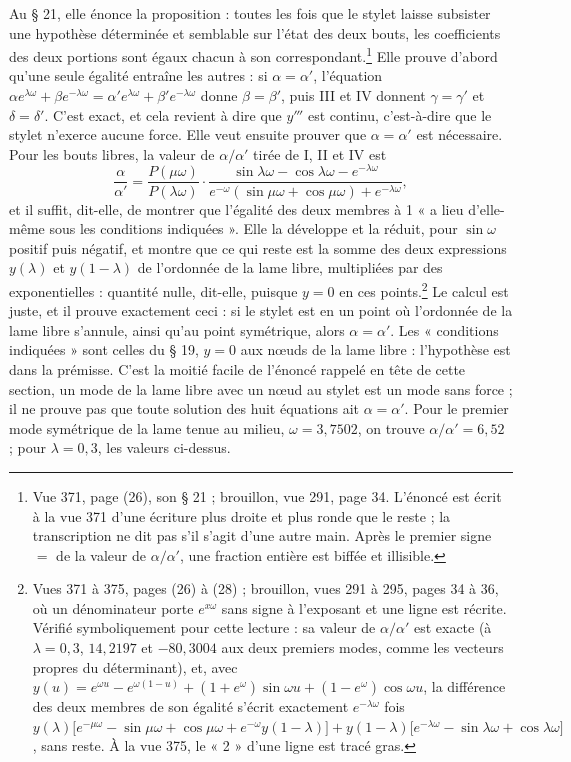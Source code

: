 \documentclass[11pt,a4paper]{article}
\begin{document}
Au § 21, elle énonce la proposition : toutes les fois que le stylet laisse subsister une hypothèse déterminée et semblable sur l'état des deux bouts, les coefficients des deux portions sont égaux chacun à son correspondant.\footnote{Vue 371, page (26), son § 21 ; brouillon, vue 291, page 34. L'énoncé est écrit à la vue 371 d'une écriture plus droite et plus ronde que le reste ; la transcription ne dit pas s'il s'agit d'une autre main. Après le premier signe $=$ de la valeur de $\alpha/\alpha'$, une fraction entière est biffée et illisible.} Elle prouve d'abord qu'une seule égalité entraîne les autres : si $\alpha=\alpha'$, l'équation $\alpha e^{\lambda\omega}+\beta e^{-\lambda\omega}=\alpha'e^{\lambda\omega}+\beta'e^{-\lambda\omega}$ donne $\beta=\beta'$, puis III et IV donnent $\gamma=\gamma'$ et $\delta=\delta'$. C'est exact, et cela revient à dire que $y'''$ est continu, c'est-à-dire que le stylet n'exerce aucune force. Elle veut ensuite prouver que $\alpha=\alpha'$ est nécessaire. Pour les bouts libres, la valeur de $\alpha/\alpha'$ tirée de I, II et IV est
\[
\frac{\alpha}{\alpha'}=\frac{P(\mu\omega)}{P(\lambda\omega)}\cdot\frac{\sin\lambda\omega-\cos\lambda\omega-e^{-\lambda\omega}}{e^{-\omega}(\sin\mu\omega+\cos\mu\omega)+e^{-\lambda\omega}},
\]
et il suffit, dit-elle, de montrer que l'égalité des deux membres à 1 « a lieu d'elle-même sous les conditions indiquées ». Elle la développe et la réduit, pour $\sin\omega$ positif puis négatif, et montre que ce qui reste est la somme des deux expressions $y(\lambda)$ et $y(1-\lambda)$ de l'ordonnée de la lame libre, multipliées par des exponentielles : quantité nulle, dit-elle, puisque $y=0$ en ces points.\footnote{Vues 371 à 375, pages (26) à (28) ; brouillon, vues 291 à 295, pages 34 à 36, où un dénominateur porte $e^{x\omega}$ sans signe à l'exposant et une ligne est récrite. Vérifié symboliquement pour cette lecture : sa valeur de $\alpha/\alpha'$ est exacte (à $\lambda=0{,}3$, $14{,}2197$ et $-80{,}3004$ aux deux premiers modes, comme les vecteurs propres du déterminant), et, avec $y(u)=e^{\omega u}-e^{\omega(1-u)}+(1+e^{\omega})\sin\omega u+(1-e^{\omega})\cos\omega u$, la différence des deux membres de son égalité s'écrit exactement $e^{-\lambda\omega}$ fois $y(\lambda)\bigl[e^{-\mu\omega}-\sin\mu\omega+\cos\mu\omega+e^{-\omega}y(1-\lambda)\bigr]+y(1-\lambda)\bigl[e^{-\lambda\omega}-\sin\lambda\omega+\cos\lambda\omega\bigr]$, sans reste. À la vue 375, le « 2 » d'une ligne est tracé gras.} Le calcul est juste, et il prouve exactement ceci : si le stylet est en un point où l'ordonnée de la lame libre s'annule, ainsi qu'au point symétrique, alors $\alpha=\alpha'$. Les « conditions indiquées » sont celles du § 19, $y=0$ aux nœuds de la lame libre : l'hypothèse est dans la prémisse. C'est la moitié facile de l'énoncé rappelé en tête de cette section, un mode de la lame libre avec un nœud au stylet est un mode sans force ; il ne prouve pas que toute solution des huit équations ait $\alpha=\alpha'$. Pour le premier mode symétrique de la lame tenue au milieu, $\omega=3{,}7502$, on trouve $\alpha/\alpha'=6{,}52$ ; pour $\lambda=0{,}3$, les valeurs ci-dessus.
\end{document}

